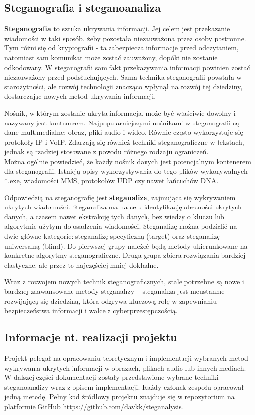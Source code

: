 \subsection{Steganografia i steganoanaliza}
\textbf{Steganografia} to sztuka ukrywania informacji. Jej celem jest przekazanie wiadomości w taki sposób, żeby
pozostała niezauważona przez osoby postronne. Tym różni się od kryptografii - ta zabezpiecza informacje
przed odczytaniem, natomiast sam komunikat może zostać zauważony, dopóki nie zostanie odkodowany. W
steganografii sam fakt przekazywania informacji powinien zostać niezauważony przed podsłuchujących.
Sama technika steganografii powstała w starożytności, ale rozwój technologii znacząco wpłynął na rozwój tej
dziedziny, dostarczając nowych metod ukrywania informacji. \cite{Johnson, khalid}

Nośnik, w którym zostanie ukryta informacja, może być właściwie dowolny i nazywany jest kontenerem.
Najpopularniejszymi nośnikami w steganografii są dane multimedialne: obraz, pliki audio i wideo. Równie
często wykorzystuje się protokoły IP i VoIP. Zdarzają się również techniki steganograficzne w tekstach,
jednak są rzadziej stosowane z powodu różnego rodzaju ograniczeń.\\
Można ogólnie powiedzieć, że każdy nośnik danych jest potencjalnym kontenerem dla steganografii.
Istnieją opisy wykorzystywania do tego plików wykonywalnych *.exe, wiadomości MMS, protokołów UDP czy nawet
łańcuchów DNA. \cite{Kozie2014WspczesneTS}


Odpowiedzią na steganografię jest \textbf{steganaliza}, zajmująca się wykrywaniem ukrytych wiadomości.
Steganaliza ma na celu identyfikację obecności ukrytych danych, a czasem nawet ekstrakcję tych danych, bez
wiedzy o kluczu lub algorytmie użytym do osadzenia wiadomości.
Steganalizę można podzielić na dwie główne kategorie: steganalizę specyficzną (target) oraz steganalizę
uniwersalną (blind). Do pierwszej grupy należeć będą metody ukierunkowane na konkretne algorytmy
steganograficzne. Druga grupa zbiera rozwiązania bardziej elastyczne, ale przez to najczęściej mniej dokładne.

Wraz z rozwojem nowych technik steganograficznych, stale potrzebne są nowe i bardziej zaawansowane metody
steganalizy -- steganaliza jest nieustannie rozwijającą się dziedziną, która odgrywa kluczową rolę w
zapewnianiu bezpieczeństwa informacji i walce z cyberprzestępczością. \cite{stat_stego_study}


\subsection{Informacje nt. realizacji projektu}
Projekt polegał na opracowaniu teoretycznym i implementacji wybranych metod wykrywania ukrytych informacji
w obrazach, plikach audio lub innych mediach.
W dalszej części dokumentacji zostały przedstawione wybrane techniki steganoanalizy wraz z opisem
implementacji. Każdy członek zespołu opracował jedną metodę. Pełny kod źródłowy projektu znajduje się w
repozytorium na platformie GitHub \url{https://github.com/davkk/steganalysis}.

